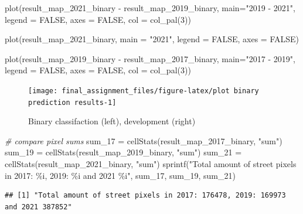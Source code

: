 \documentclass[
]{article}
\newenvironment{Shaded}{\begin{snugshade}}{\end{snugshade}}
\newcommand{\AttributeTok}[1]{\textcolor[rgb]{0.77,0.63,0.00}{#1}}
\newcommand{\CommentTok}[1]{\textcolor[rgb]{0.56,0.35,0.01}{\textit{#1}}}
\newcommand{\ConstantTok}[1]{\textcolor[rgb]{0.00,0.00,0.00}{#1}}
\newcommand{\DecValTok}[1]{\textcolor[rgb]{0.00,0.00,0.81}{#1}}
\newcommand{\FunctionTok}[1]{\textcolor[rgb]{0.00,0.00,0.00}{#1}}
\newcommand{\NormalTok}[1]{#1}
\newcommand{\OtherTok}[1]{\textcolor[rgb]{0.56,0.35,0.01}{#1}}
\newcommand{\SpecialCharTok}[1]{\textcolor[rgb]{0.00,0.00,0.00}{#1}}
\newcommand{\StringTok}[1]{\textcolor[rgb]{0.31,0.60,0.02}{#1}}
\begin{document}
\begin{Shaded}
\begin{Highlighting}[]
\FunctionTok{plot}\NormalTok{(result\_map\_2021\_binary }\SpecialCharTok{{-}}\NormalTok{ result\_map\_2019\_binary, }\AttributeTok{main=}\StringTok{"2019 {-} 2021"}\NormalTok{, }
     \AttributeTok{legend =} \ConstantTok{FALSE}\NormalTok{, }\AttributeTok{axes =} \ConstantTok{FALSE}\NormalTok{, }\AttributeTok{col =} \FunctionTok{col\_pal}\NormalTok{(}\DecValTok{3}\NormalTok{))}

\FunctionTok{plot}\NormalTok{(result\_map\_2021\_binary, }\AttributeTok{main =} \StringTok{"2021"}\NormalTok{, }\AttributeTok{legend =} \ConstantTok{FALSE}\NormalTok{, }\AttributeTok{axes =} \ConstantTok{FALSE}\NormalTok{)}

\FunctionTok{plot}\NormalTok{(result\_map\_2019\_binary }\SpecialCharTok{{-}}\NormalTok{ result\_map\_2017\_binary, }\AttributeTok{main=}\StringTok{"2017 {-} 2019"}\NormalTok{, }
     \AttributeTok{legend =} \ConstantTok{FALSE}\NormalTok{, }\AttributeTok{axes =} \ConstantTok{FALSE}\NormalTok{, }\AttributeTok{col =} \FunctionTok{col\_pal}\NormalTok{(}\DecValTok{3}\NormalTok{))}
\end{Highlighting}
\end{Shaded}

\begin{figure}

{\centering \texttt{[image: final\_assignment\_files/figure-latex/plot binary prediction results-1]} 

}

\caption{Binary classifaction (left), development (right)}\label{fig:plot binary prediction results}
\end{figure}

\begin{Shaded}
\begin{Highlighting}[]
\CommentTok{\# compare pixel sums}
\NormalTok{sum\_17 }\OtherTok{=} \FunctionTok{cellStats}\NormalTok{(result\_map\_2017\_binary, }\StringTok{"sum"}\NormalTok{)}
\NormalTok{sum\_19 }\OtherTok{=} \FunctionTok{cellStats}\NormalTok{(result\_map\_2019\_binary, }\StringTok{"sum"}\NormalTok{)}
\NormalTok{sum\_21 }\OtherTok{=} \FunctionTok{cellStats}\NormalTok{(result\_map\_2021\_binary, }\StringTok{"sum"}\NormalTok{)}
\FunctionTok{sprintf}\NormalTok{(}\StringTok{"Total amount of street pixels in 2017: \%i, 2019: \%i and 2021 \%i"}\NormalTok{, sum\_17, sum\_19, sum\_21)}
\end{Highlighting}
\end{Shaded}

\begin{verbatim}
## [1] "Total amount of street pixels in 2017: 176478, 2019: 169973 and 2021 387852"
\end{verbatim}
\end{document}
